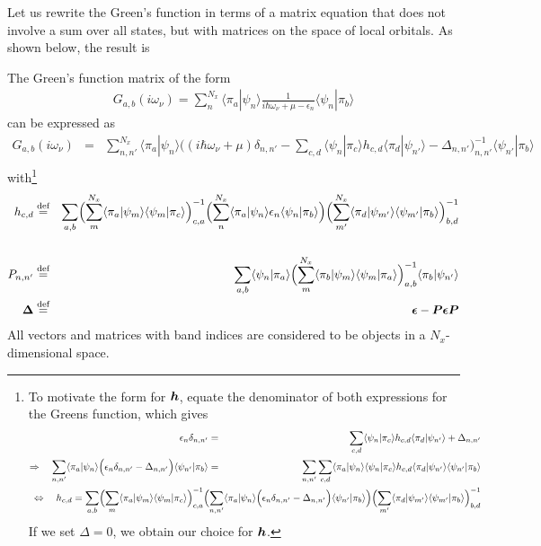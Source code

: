 \documentclass[11pt,a4paper]{report}
\begin{document}
Let us rewrite the Green's function in terms of a matrix
equation that does not involve a sum over all states, but with
matrices on the space of local orbitals. As shown below, the result is
\begin{myshadowminipage}{}
The Green's function matrix of the form 
\begin{eqnarray}
G_{a,b}(i\omega_\nu)
=\sum_n^{N_x}\langle\pi_a|\psi_n\rangle\frac{1}{i\hbar\omega_\nu+\mu-\epsilon_n}
\langle\psi_n|\pi_b\rangle
\label{eq:greenmatrix1aa}
\end{eqnarray}
can be expressed as
\begin{eqnarray}
G_{a,b}(i\omega_\nu)
&=&\sum_{n,n'}^{N_x}\langle\pi_a|\psi_n\rangle
\biggl((i\hbar\omega_\nu+\mu)\delta_{n,n'}-
\sum_{c,d}\langle\psi_n|\pi_c\rangle h_{c,d}\langle\pi_d|\psi_{n'}\rangle
-\Delta_{n,n'}\biggr)^{-1}_{n,n'}
\langle\psi_{n'}|\pi_b\rangle
\nonumber\\
\label{eq:greenmatrix2a}
\end{eqnarray}
with\footnote{To motivate the form for $\bm{h}$, equate the
  denominator of both expressions for the Greens function, which gives
\begin{eqnarray}
\epsilon_n\delta_{n,n'}
&=&\sum_{c,d}\langle\psi_n|\pi_c\rangle h_{c,d}\langle\pi_d|\psi_{n'}\rangle
+\Delta_{n,n'}
\nonumber\\
\Rightarrow\quad
\sum_{n,n'}\langle\pi_a|\psi_n\rangle
\Bigl(\epsilon_n\delta_{n,n'}-\Delta_{n,n'}\Bigr)
\langle\psi_{n'}|\pi_b\rangle
&=&\sum_{n,n'}\sum_{c,d}\langle\pi_a|\psi_n\rangle\langle\psi_n|\pi_c\rangle 
h_{c,d}\langle\pi_d|\psi_{n'}\rangle\langle\psi_{n'}|\pi_b\rangle
\nonumber\\
&&\hspace{-7cm}
\Leftrightarrow\quad h_{c,d}=\sum_{a,b}
\Bigl(\sum_m\langle\pi_a|\psi_m\rangle\langle\psi_m|\pi_c\rangle \Bigr)^{-1}_{c,a}
\Bigl(\sum_{n,n'}\langle\pi_a|\psi_n\rangle
\Bigl(\epsilon_n\delta_{n,n'}-\Delta_{n,n'}\Bigr)
\langle\psi_{n'}|\pi_b\rangle\Bigr)
\Bigl(\sum_{m'}
\langle\pi_d|\psi_{m'}\rangle\langle\psi_{m'}|\pi_b\rangle \Bigr)^{-1}_{b,d}
\nonumber
\end{eqnarray}
If we set $\Delta=0$, we obtain our choice for $\bm{h}$.}
\begin{eqnarray}
h_{c,d}&\stackrel{\text{def}}{=}&
\sum_{a,b}
\Bigl(\sum_{m}^{N_x}
\langle\pi_a|\psi_m\rangle\langle\psi_m|\pi_c\rangle \Bigr)^{-1}_{c,a}
\Bigl(\sum_{n}^{N_x}\langle\pi_a|\psi_n\rangle\epsilon_n
\langle\psi_n|\pi_b\rangle\Bigr)
\Bigl(\sum_{m'}^{N_x}\langle\pi_d|\psi_{m'}\rangle
\langle\psi_{m'}|\pi_b\rangle \Bigr)^{-1}_{b,d}
\nonumber\\
\label{eq:defhmatforgreensfunction}
\\
P_{n,n'}&\stackrel{\text{def}}{=}&
\sum_{a,b}\langle\psi_n|\pi_a\rangle
\Bigl(\sum_{m}^{N_x}
\langle\pi_b|\psi_m\rangle\langle\psi_m|\pi_a\rangle \Bigr)^{-1}_{a,b}
\langle\pi_b|\psi_{n'}\rangle
\label{eq:defpmat}
\\
\bm{\Delta}&\stackrel{\text{def}}{=}&\bm{\epsilon}-\bm{P}\bm{\epsilon}\bm{P}
\label{eq:defdelta}
\end{eqnarray}
All vectors and matrices with band indices are considered to be
objects in a $N_x$-dimensional space.



\end{myshadowminipage}
\end{document}
